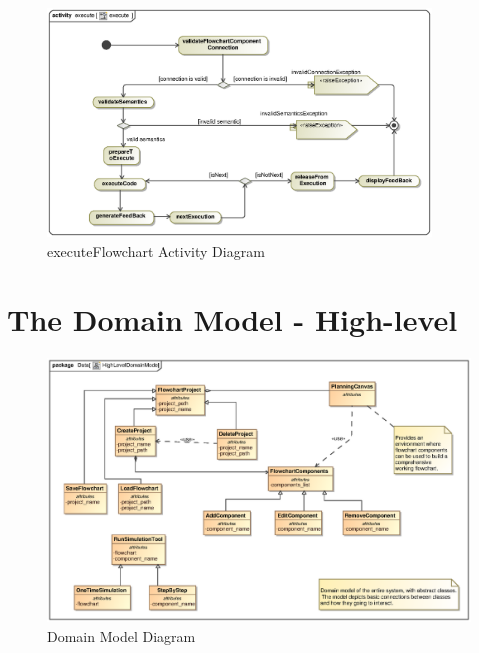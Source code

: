 \documentclass[11pt,a4paper,titlepage]{article}
\begin{document}
\begin{figure}[H]
  \centering
\includegraphics[width=385px]{executeAct.eps}
\caption{executeFlowchart Activity Diagram}
\end{figure}

\newpage
\section{The Domain Model - High-level}
\begin{figure}[H]
  \centering
\includegraphics[width=500px]{HighLevelDomainModel.eps}
\caption{Domain Model Diagram}
\end{figure}
\end{document}
